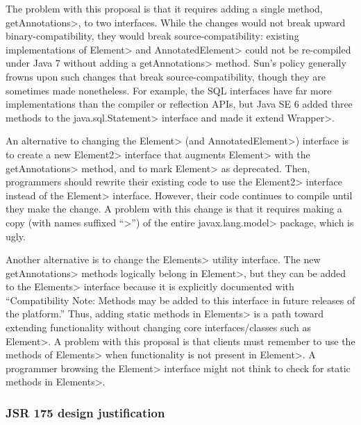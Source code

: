 \documentclass[10pt]{article}
\begin{document}
The problem with this proposal is that it requires adding a single method,
\<getAnnotations>, to two interfaces.  While the changes would not break
upward binary-compatibility, they would break source-compatibility:
existing implementations of \<Element> and \<AnnotatedElement> could not
be re-compiled under Java 7 without adding a \<getAnnotations> method.
Sun's policy generally frowns upon such changes that break
source-compatibility, though they are sometimes made nonetheless.
For example, the
SQL interfaces have far more implementations than the compiler or
reflection APIs, but Java SE 6 added three methods to the
\<java.sql.Statement> interface and made it extend \<Wrapper>.

An alternative to changing the \<Element> (and \<AnnotatedElement>) interface is to create a new
\<Element2> interface that augments \<Element> with the \<getAnnotations>
method, and to mark \<Element> as deprecated.  Then, programmers should
rewrite their existing code to use the \<Element2> interface instead of the
\<Element> interface.  However, their code continues to compile until they
make the change.  A problem with this change is that it requires making a
copy (with names suffixed ``>'') of the entire \<javax.lang.model>
package, which is ugly.

Another alternative is to change the \<Elements> utility interface.  The
new \<getAnnotations> methods logically belong in \<Element>, but they can
be added to the \<Elements> interface because it is explicitly documented
with ``Compatibility Note: Methods may be added to this interface in future
releases of the platform.''  Thus, adding static methods in \<Elements> is
a path toward extending functionality without changing core
interfaces/classes such as \<Element>.  A problem with this proposal is
that clients must remember to use the methods of \<Elements> when
functionality is not present in \<Element>.  A programmer browsing the
\<Element> interface might not think to check for static methods in
\<Elements>.


\subsubsection{JSR 175 design justification\label{duplicate-annotations-jsr175-justification}}
\end{document}
